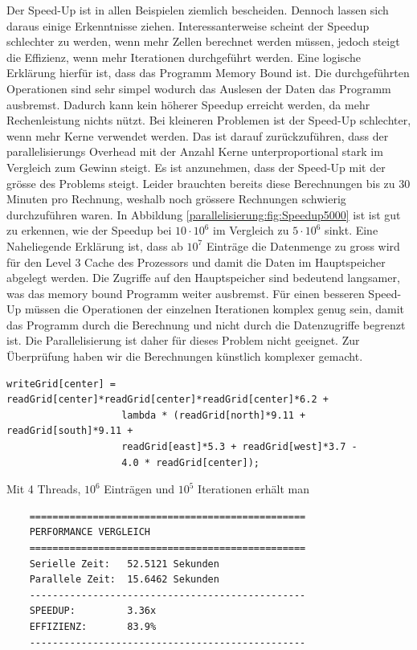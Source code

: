 Der Speed-Up ist in allen Beispielen ziemlich bescheiden.
Dennoch lassen sich daraus einige Erkenntnisse ziehen.
Interessanterweise scheint der Speedup schlechter zu werden, wenn mehr Zellen berechnet werden müssen, jedoch steigt die Effizienz, wenn mehr Iterationen durchgeführt werden.
Eine logische Erklärung hierfür ist, dass das Programm Memory Bound ist.
Die durchgeführten Operationen sind sehr simpel wodurch das Auslesen der Daten das Programm ausbremst.
Dadurch kann kein höherer Speedup erreicht werden, da mehr Rechenleistung nichts nützt. 
Bei kleineren Problemen ist der Speed-Up schlechter, wenn mehr Kerne verwendet werden.
Das ist darauf zurückzuführen, dass der parallelisierungs Overhead mit der Anzahl Kerne unterproportional stark im Vergleich zum Gewinn steigt.
Es ist anzunehmen, dass der Speed-Up mit der grösse des Problems steigt.
Leider brauchten bereits diese Berechnungen bis zu 30 Minuten pro Rechnung, weshalb noch grössere Rechnungen schwierig durchzuführen waren.
In Abbildung \ref{parallelisierung:fig:Speedup5000} ist ist gut zu erkennen, wie der Speedup bei $10 \cdot 10^6$ im Vergleich zu $5 \cdot 10^6$ sinkt.
Eine Naheliegende Erklärung ist, dass ab $10^7$ Einträge die Datenmenge zu gross wird für den Level 3 Cache des Prozessors und damit die Daten im Hauptspeicher abgelegt werden.
Die Zugriffe auf den Hauptspeicher sind bedeutend langsamer, was das memory bound Programm weiter ausbremst.
Für einen besseren Speed-Up müssen die Operationen der einzelnen Iterationen komplex genug sein, damit das Programm durch die Berechnung und nicht durch die Datenzugriffe begrenzt ist.
Die Parallelisierung ist daher für dieses Problem nicht geeignet.
Zur Überprüfung haben wir die Berechnungen künstlich komplexer gemacht.

\begin{lstlisting}
writeGrid[center] = readGrid[center]*readGrid[center]*readGrid[center]*6.2 +
					lambda * (readGrid[north]*9.11 + readGrid[south]*9.11 +
					readGrid[east]*5.3 + readGrid[west]*3.7 -
					4.0 * readGrid[center]);	
\end{lstlisting}

Mit 4 Threads, $10^6$ Einträgen und $10^5$ Iterationen erhält man 

\begin{lstlisting}
	================================================
	PERFORMANCE VERGLEICH
	================================================
	Serielle Zeit:   52.5121 Sekunden
	Parallele Zeit:  15.6462 Sekunden
	------------------------------------------------
	SPEEDUP:         3.36x
	EFFIZIENZ:       83.9%
	------------------------------------------------
\end{lstlisting}
